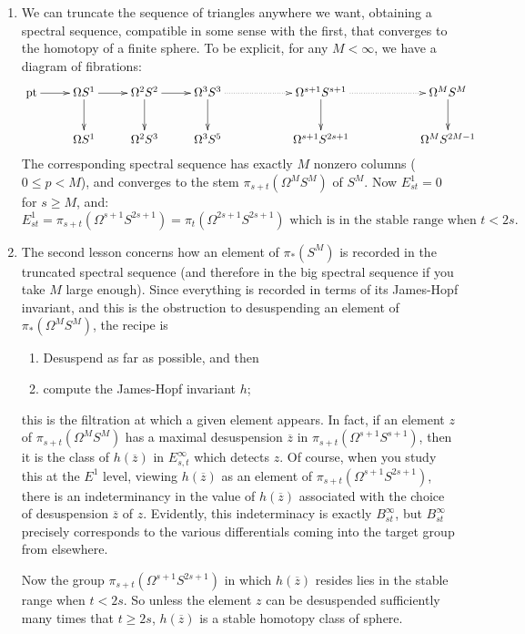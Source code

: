 \documentclass{article}
\newcommand{\ptspace}{\mathrm{pt}}
\newcommand{\Loops}{\Omega}
\begin{document}
\begin{enumerate}
\item We can truncate the sequence of triangles anywhere we want, obtaining a spectral sequence, compatible in some sense with the first, that converges to the homotopy of a finite sphere. To be explicit, for any $M<\infty$, we have a diagram of fibrations:
\[\xymatrix{
\ptspace\ar[r]&\Omega S^1\ar[d]\ar[r]&\Omega^2 S^2\ar[d]\ar[r]&\Omega^3 S^3\ar[d]\ar@{.>}[rr]&&\Omega^{s+1}S^{s+1}\ar[d]\ar@{.>}[rr]&&\Omega^{M}S^{M}\ar[d]\\
&\Omega S^1&\Omega^2 S^3& \Omega^3S^5&&\Omega^{s+1}S^{2s+1}&&\Omega^{M}S^{2M-1}
}\]
The corresponding spectral sequence has exactly $M$ nonzero columns ($0\leq p <M$), and converges to the stem $\pi_{s+t}(\Omega^{M}S^{M})$ of $S^{M}$. Now $E^1_{st}=0$ for $s\geq M$, and:
\[E_{st}^1=\pi_{s+t}(\Omega^{s+1}S^{2s+1})=\pi_t(\Omega^{2s+1}S^{2s+1})\text{ which is in the stable range when $t< 2s$}.\]

\item The second lesson concerns how an element of $\pi_* (S^M)$ is recorded in the truncated spectral sequence (and therefore in the big spectral sequence if you take $M$ large enough).  Since everything is recorded in terms of its James-Hopf invariant, and this is the obstruction to desuspending an element of $\pi_* (\Loops^M S^M)$, the recipe is
\begin{enumerate}
\item Desuspend as far as possible, and then
\item compute the James-Hopf invariant $h$;
\end{enumerate}
this is the filtration at which a given element appears. In fact, if an element $z$ of $\pi_{s+t}(\Omega^MS^M)$ has a maximal desuspension $\overline z$ in $\pi_{s+t}(\Omega^{s+1}S^{s+1})$, then it is the class of $h(\overline z)$ in $E^{\infty}_{s,t}$ which detects $z$. Of course, when you study this at the $E^1$ level, viewing $h(\overline z)$ as an element of $\pi_{s+t}(\Omega^{s+1}S^{2s+1})$, there is an indeterminancy in the value of $h(\overline z)$ associated with the choice of desuspension $\overline z$ of $z$. Evidently, this indeterminacy is exactly $B_{st}^\infty$, but $B_{st}^\infty$ precisely corresponds to the various differentials coming into the target group from elsewhere.

Now the group $\pi_{s+t}(\Omega^{s+1}S^{2s+1})$ in which $h(\overline z)$ resides lies in the stable range when $t<2s$. So unless the element $z$ can be desuspended sufficiently many times that $t\geq2s$, $h(\overline z)$ is a stable homotopy class of sphere.


\end{enumerate}
\end{document}

